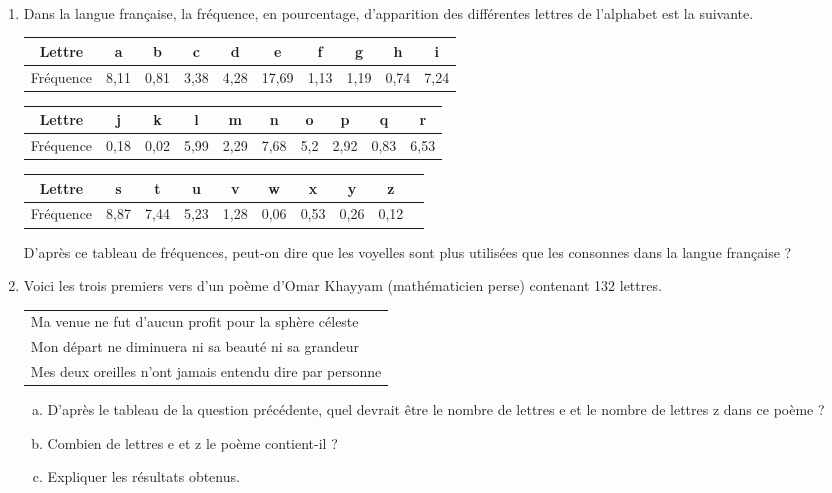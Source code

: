\documentclass[12pt]{article}
\begin{document}
  \begin{exercice}[Statistiques]~
    \begin{enumerate}[(1)]
      \item Dans la langue française, la fréquence, en pourcentage, d'apparition des différentes lettres de l'alphabet est la suivante.

        \hspace{-1cm}\begin{tabular}{c|c|c|c|c|c|c|c|c|c}
          Lettre&a&b&c&d&e&f&g&h&i\\\hline
          Fréquence & 8,11 & 0,81 & 3,38 & 4,28 & 17,69 & 1,13 & 1,19 & 0,74 & 7,24 \\
        \end{tabular}

        \hspace{-1cm}\begin{tabular}{c|c|c|c|c|c|c|c|c|c}
          Lettre&j&k&l&m&n&o&p&q&r\\\hline
          Fréquence & 0,18 & 0,02 & 5,99 & 2,29 & 7,68 & 5,2 & 2,92 & 0,83 & 6,53 \\
        \end{tabular}

        \hspace{-1cm}\begin{tabular}{c|c|c|c|c|c|c|c|c|c}
          Lettre&s&t&u&v&w&x&y&z\\
          \hline
          Fréquence & 8,87 & 7,44 & 5,23 & 1,28 & 0,06 & 0,53 & 0,26 & 0,12
        \end{tabular}

        D'après ce tableau de fréquences, peut-on dire que les voyelles sont plus utilisées que les consonnes dans la langue française ?

      \item Voici les trois premiers vers d'un poème d'Omar Khayyam
        (mathématicien perse) contenant 132 lettres.

        \begin{tabular}{|l}
          Ma venue ne fut d'aucun profit pour la sphère céleste\\
          Mon départ ne diminuera ni sa beauté ni sa grandeur\\
          Mes deux oreilles n'ont jamais entendu dire par personne\\
        \end{tabular}

        \begin{enumerate}[(a)]
          \item D'après le tableau de la question précédente, quel devrait être le nombre de lettres \og{}e\fg{} et le nombre de lettres \og{}z\fg{} dans ce poème ?
          \item Combien de lettres \og{}e\fg{} et \og{}z\fg{} le poème contient-il ?
          \item Expliquer les résultats obtenus.
        \end{enumerate}


\end{enumerate}
\end{exercice}
\end{document}
